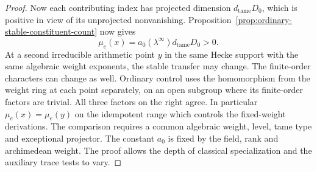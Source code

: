 \begin{proof}
Now each contributing index has projected
dimension \(d_{\mathrm{tame}}D_0\), which is
positive in view of its unprojected
nonvanishing. Proposition~\ref{prop:ordinary-stable-constituent-count}
now gives
\[
             \mu_e(x)=a_0(\lambda^\infty)
                             d_{\mathrm{tame}}D_0>0.
\]
At a second irreducible arithmetic point
\(y\) in the same Hecke support with the same algebraic
weight exponents, the stable transfer may change. The
finite-order characters can change as well. Ordinary
control uses the homomorphism from the weight ring
at each point separately, on an open subgroup where
its finite-order factors are trivial.
All three factors on the right agree.
In particular \(\mu_e(x)=\mu_e(y)\) on
the idempotent range which controls the
fixed-weight derivations. The comparison
requires a common algebraic weight, level, tame type
and exceptional projector. The constant
\(a_0\) is fixed by the field, rank and
archimedean weight. The proof allows the
depth of classical specialization and
the auxiliary trace tests to vary.
\end{proof}
